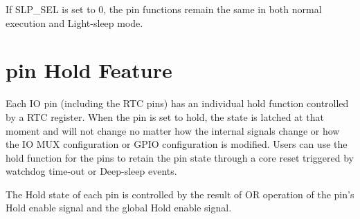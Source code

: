 \documentclass[main\_\_EN.tex]{subfiles}
\begin{document}
If SLP\_SEL is set to 0, the pin functions remain the same in both normal execution and Light-sleep mode.

\section{pin Hold Feature}\label{PadHold}

Each IO pin (including the RTC pins) has an individual hold function controlled by a RTC register. When the pin is set to hold, the state is latched at that moment and will not change no matter how the internal signals change or how the IO MUX configuration or GPIO configuration is modified. Users can use the hold function for the pins to retain the pin state through a core reset triggered by watchdog time-out or Deep-sleep events.

The Hold state of each pin is controlled by the result of OR operation of the pin's Hold enable signal and the global Hold enable signal.
\end{document}
